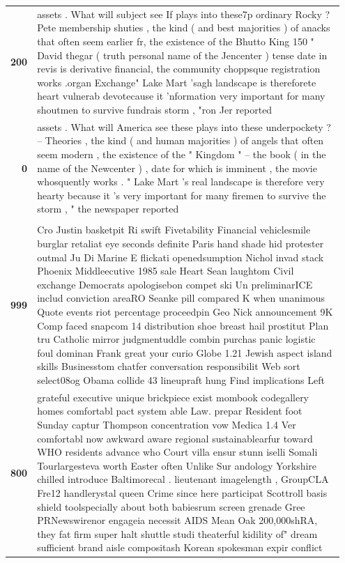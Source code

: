 {\begin{tabular}{rp{0.95\linewidth}}
\textbf{200} &\strut{}assets . What will subject see If plays into these7p ordinary Rocky ? Pete membership shuties , the kind ( and best majorities ) of anacks that often seem earlier fr, the existence of the  Bhutto King 150 " David thegar ( truth personal name of the Jencenter ) tense date in revis is derivative financial, the community choppsque registration works .organ Exchange" Lake Mart 'sagh landscape is thereforete heart vulnerab devotecause it 'nformation very important for many shoutmen to survive fundrais storm , "ron Jer reported\\
\textbf{0} &\strut{}assets . What will America see these plays into these underpockety ? -- Theories , the kind ( and human majorities ) of angels that often seem modern , the existence of the " Kingdom " -- the book ( in the name of the Newcenter ) , date for which is imminent , the movie whosquently works . " Lake Mart 's real landscape is therefore very hearty because it 's very important for many firemen to survive the storm , " the newspaper reported\\
\hline\\
\textbf{999} &\strut{}Cro Justin basketpit Ri swift Fivetability Financial vehiclesmile burglar retaliat eye seconds definite Paris hand shade hid protester outmal Ju Di Marine E flickati openedsumption Nichol invad stack Phoenix Middleecutive 1985 sale Heart Sean laughtom Civil exchange Democrats apologisebon compet ski Un preliminarICE includ conviction areaRO Seanke pill compared K when unanimous Quote events riot percentage proceedpin Geo Nick announcement 9K Comp faced snapcom 14 distribution shoe breast hail prostitut Plan tru Catholic mirror judgmentuddle combin purchas panic logistic foul dominan Frank great your curio Globe 1.21 Jewish aspect island skills Businesstom chatfer conversation responsibilit Web sort select08og Obama collide 43 lineupraft hung Find implications Left\\
\textbf{800} &\strut{}grateful executive unique brickpiece exist mombook codegallery homes comfortabl pact system able Law. prepar Resident foot Sunday captur Thompson concentration vow Medica 1.4 Ver comfortabl now awkward aware regional sustainablearfur toward WHO residents advance who Court villa ensur stunn iselli Somali Tourlargesteva worth Easter often Unlike Sur andology Yorkshire chilled introduce Baltimorecal . lieutenant imagelength , GroupCLA Fre12 handlerystal queen Crime since here participat Scottroll basis shield toolspecially about both babiesrum screen grenade Gree PRNewswirenor engageia necessit AIDS Mean Oak 200,000shRA, they fat firm super halt shuttle studi theaterful kidility of" dream sufficient brand aisle compositash Korean spokesman expir conflict\\

\end{tabular}}
